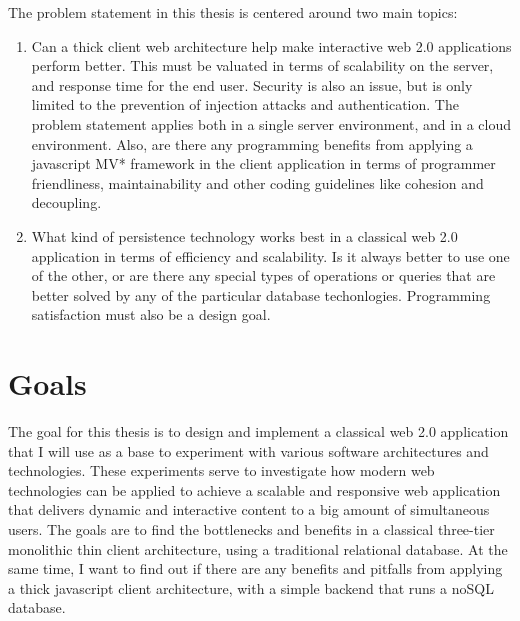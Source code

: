 The problem statement in this thesis is centered around two
        main topics:

\begin {enumerate}
\item Can a thick client web architecture help make
          interactive web 2.0 applications perform better. This must
          be valuated in terms of scalability on the server, and
          response time for the end user. Security is also an issue,
          but is only limited to the prevention of injection attacks
          and authentication. The problem statement applies both in
          a single server environment, and in a cloud environment.
          Also, are there any programming benefits from applying a
          javascript MV* framework in the client application in terms
          of programmer friendliness, maintainability and other coding
          guidelines like cohesion and decoupling.
 
\item	What kind of persistence technology works best in a
          classical web 2.0 application in terms of efficiency and
          scalability. Is it always better to use one of the other, or
          are there any special types of operations or queries that are better
          solved by any of the particular database
          techonlogies. Programming satisfaction must also be a design
          goal.
\end{enumerate}
				
\section{Goals}
	The goal for this thesis is to design and implement a
                classical web 2.0 application that I will use as a
                base to experiment with various software architectures
                and technologies. These
                experiments serve to investigate how modern web
                technologies can be applied to achieve a scalable and
                responsive web application that delivers dynamic and
                interactive content to a big amount of simultaneous
                users. The goals are to find the bottlenecks and
                benefits in a classical three-tier monolithic thin
                client architecture, using a traditional relational
                database. At the same time, I want to find out if
                there are any benefits and pitfalls from applying a
                thick javascript client architecture, with a simple
                backend that runs a noSQL database.  
	
